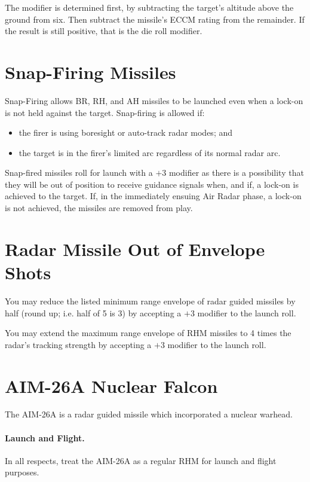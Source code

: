 The modifier is determined first, by subtracting the target's altitude above the ground from six. Then subtract the missile's ECCM rating from the remainder. If the result is still positive, that is the die roll modifier.


\advancedrules

\section{Snap-Firing Missiles}

Snap-Firing allows BR, RH, and AH missiles to be launched even when a lock-on is not held against the target. Snap-firing is allowed if:

\begin{itemize}
    \item the firer is using boresight or auto-track radar modes; and
    \item the target is in the firer's limited arc regardless of its normal radar arc.
\end{itemize}

Snap-fired missiles roll for launch with a $+3$ modifier as there is a possibility that they will be out of position to receive guidance signals when, and if, a lock-on is achieved to the target. If, in the immediately ensuing Air Radar phase, a lock-on is not achieved, the missiles are removed from play.

\section{Radar Missile Out of Envelope Shots}

You may reduce the listed minimum range envelope of radar guided missiles by half (round up; i.e. half of 5 is 3) by accepting a $+3$ modifier to the launch roll.

You may extend the maximum range envelope of RHM missiles to 4 times the radar's tracking strength by accepting a $+3$ modifier to the launch roll.

\section{AIM-26A Nuclear Falcon}

The AIM-26A is a radar guided missile which incorporated a nuclear warhead.

\paragraph{Launch and Flight.} In all respects, treat the AIM-26A as a regular RHM for launch and flight purposes.

